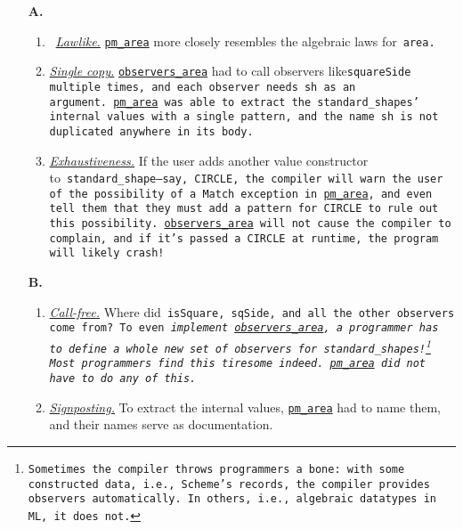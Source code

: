 \documentclass[manuscript,screen 12pt, nonacm]{acmart}
\begin{document}
    \begin{enumerate}
      \item [\textbf{A.}]
      \begin{enumerate}[label=\arabic*]
        \item~\hyperref[p1]{\it{Lawlike.}}
        \hyperref[fig:pmarea]{\tt{pm\_area}} more closely resembles the
        algebraic laws for~\tt{area}. 
        \item\hyperref[p2]{\it{Single copy.}}
        \hyperref[fig:observersarea]{\tt{observers\_area}} had to call observers
        like\tt{squareSide} multiple times, and each observer needs~\tt{sh} as
        an argument.~\hyperref[fig:pmarea]{\tt{pm\_area}} was able to extract
        the~\tt{standard\_shape}s' internal values with a single pattern, and
        the name~\tt{sh} is not duplicated anywhere in its body. 
        \item\hyperref[p5]{\it{Exhaustiveness.}} 
        If the user adds another value
        constructor to~\tt{standard\_shape}---say,~\tt{CIRCLE}, the compiler
        will warn the user of the possibility of a~\tt{Match} exception in
        \hyperref[fig:pmarea]{\tt{pm\_area}}, and even tell them that they must
        add a pattern for~\tt{CIRCLE} to rule out this possibility.
        \hyperref[fig:observersarea]{\tt{observers\_area}} will not cause the
        compiler to complain, and if it's passed a~\tt{CIRCLE} at runtime, the
        program will likely crash! 
    \end{enumerate}
      
    \item [\textbf{B.}]
      \begin{enumerate}[start=4, label=\arabic*]
        \item\hyperref[p3]{\it{Call-free.}} Where did~\tt{isSquare},
        \tt{sqSide}, and all the other observers come from? To even
        \it{implement}~\hyperref[fig:observersarea]{\tt{observers\_area}}, a
        programmer has to define a whole new set of observers for
        \tt{standard\_shape}s!\footnote{Sometimes the compiler throws
        programmers a bone: with some constructed data, i.e., Scheme's records,
        the compiler provides observers automatically. In others, i.e.,
        algebraic datatypes in ML, it does not.} Most programmers find this
        tiresome indeed.~\hyperref[fig:pmarea]{\tt{pm\_area}} did not have to do
        any of this.
        \item\hyperref[p4]{\it{Signposting.}} 
        To extract the internal values,
        \hyperref[fig:pmarea]{\tt{pm\_area}} had to name them, and their names
        serve as documentation. 
      \end{enumerate}
    \end{enumerate}
\end{document}
